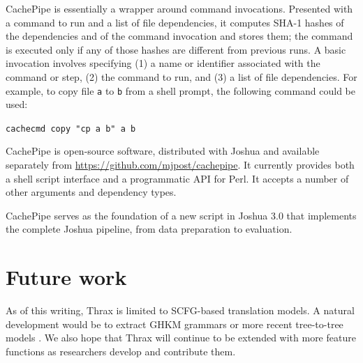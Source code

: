 \documentclass[11pt]{article}
\begin{document}
\noindent CachePipe is essentially a wrapper around command
invocations.  Presented with a command to run
and a list of file dependencies, it computes SHA-1 hashes of the
dependencies and of the command invocation and stores them; the
command is executed only if any of those hashes are different from
previous runs.  A
basic invocation involves specifying (1) a name or identifier
associated with the command or step, (2) the command to run, and (3) a
list of file dependencies.  For example, to copy file \verb|a| to
\verb|b| from a shell prompt, the following command could be used:

\verb|cachecmd copy "cp a b" a b|

\noindent CachePipe is open-source software, distributed with Joshua
and available separately from
\url{https://github.com/mjpost/cachepipe}.  It currently provides both
a shell script interface and a programmatic API for Perl.  It accepts
a number of other arguments and dependency types.

CachePipe serves as the foundation of a new script in Joshua 3.0 that
implements the complete Joshua pipeline, from data preparation to
evaluation.

\section{Future work}

As of this writing, Thrax is limited to SCFG-based translation models.
A natural development would be to extract GHKM grammars
\cite{galley2004whats} or more recent tree-to-tree models
\cite{zhang2008,liu2009,chiang2010}.  We also hope that Thrax will
continue to be extended with more feature functions as researchers
develop and contribute them.




\end{document}
